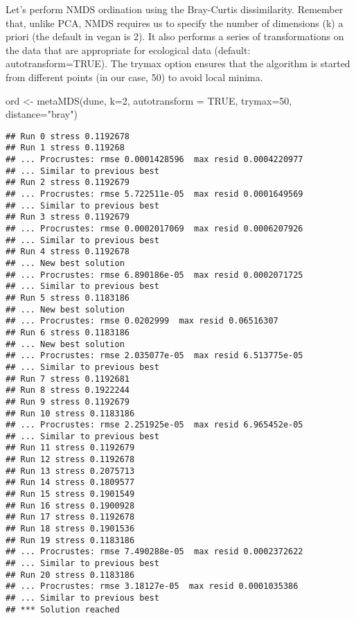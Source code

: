 \documentclass[
]{book}
\newenvironment{Shaded}{\begin{snugshade}}{\end{snugshade}}
\newcommand{\AttributeTok}[1]{\textcolor[rgb]{0.77,0.63,0.00}{#1}}
\newcommand{\ConstantTok}[1]{\textcolor[rgb]{0.00,0.00,0.00}{#1}}
\newcommand{\DecValTok}[1]{\textcolor[rgb]{0.00,0.00,0.81}{#1}}
\newcommand{\FunctionTok}[1]{\textcolor[rgb]{0.00,0.00,0.00}{#1}}
\newcommand{\NormalTok}[1]{#1}
\newcommand{\OtherTok}[1]{\textcolor[rgb]{0.56,0.35,0.01}{#1}}
\newcommand{\StringTok}[1]{\textcolor[rgb]{0.31,0.60,0.02}{#1}}
\begin{document}
Let's perform NMDS ordination using the Bray-Curtis dissimilarity. Remember that, unlike PCA, NMDS requires us to specify the number of dimensions (k) a priori (the default in vegan is 2). It also performs a series of transformations on the data that are appropriate for ecological data (default: autotransform=TRUE). The trymax option ensures that the algorithm is started from different points (in our case, 50) to avoid local minima.

\begin{Shaded}
\begin{Highlighting}[]
\NormalTok{ord }\OtherTok{\textless{}{-}} \FunctionTok{metaMDS}\NormalTok{(dune, }\AttributeTok{k=}\DecValTok{2}\NormalTok{, }\AttributeTok{autotransform =} \ConstantTok{TRUE}\NormalTok{, }\AttributeTok{trymax=}\DecValTok{50}\NormalTok{, }\AttributeTok{distance=}\StringTok{"bray"}\NormalTok{)}
\end{Highlighting}
\end{Shaded}

\begin{verbatim}
## Run 0 stress 0.1192678 
## Run 1 stress 0.119268 
## ... Procrustes: rmse 0.0001428596  max resid 0.0004220977 
## ... Similar to previous best
## Run 2 stress 0.1192679 
## ... Procrustes: rmse 5.722511e-05  max resid 0.0001649569 
## ... Similar to previous best
## Run 3 stress 0.1192679 
## ... Procrustes: rmse 0.0002017069  max resid 0.0006207926 
## ... Similar to previous best
## Run 4 stress 0.1192678 
## ... New best solution
## ... Procrustes: rmse 6.890186e-05  max resid 0.0002071725 
## ... Similar to previous best
## Run 5 stress 0.1183186 
## ... New best solution
## ... Procrustes: rmse 0.0202999  max resid 0.06516307 
## Run 6 stress 0.1183186 
## ... New best solution
## ... Procrustes: rmse 2.035077e-05  max resid 6.513775e-05 
## ... Similar to previous best
## Run 7 stress 0.1192681 
## Run 8 stress 0.1922244 
## Run 9 stress 0.1192679 
## Run 10 stress 0.1183186 
## ... Procrustes: rmse 2.251925e-05  max resid 6.965452e-05 
## ... Similar to previous best
## Run 11 stress 0.1192679 
## Run 12 stress 0.1192678 
## Run 13 stress 0.2075713 
## Run 14 stress 0.1809577 
## Run 15 stress 0.1901549 
## Run 16 stress 0.1900928 
## Run 17 stress 0.1192678 
## Run 18 stress 0.1901536 
## Run 19 stress 0.1183186 
## ... Procrustes: rmse 7.490288e-05  max resid 0.0002372622 
## ... Similar to previous best
## Run 20 stress 0.1183186 
## ... Procrustes: rmse 3.18127e-05  max resid 0.0001035386 
## ... Similar to previous best
## *** Solution reached
\end{verbatim}
\end{document}
